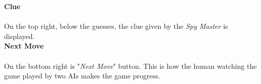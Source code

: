 \documentclass[10pt, a4paper]{article}
\begin{document}
	   \textbf{Clue}\\
	   \\
	   On the top right, below the guesses, the clue given by the \textit{Spy Master} is displayed.\\
	   
	   
	   \textbf{Next Move}\\
	   \\
	   On the bottom right is "\textit{Next Move}" button. This is how the human watching the game played by two AIs makes the game progress.\\
	   
	 
	
\end{document}
